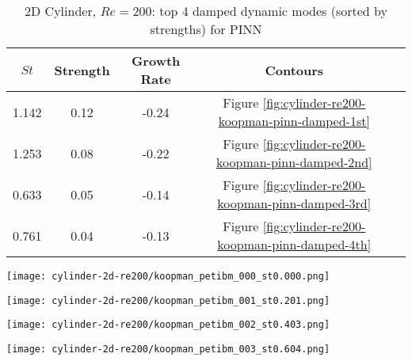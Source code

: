 \begin{table}[hbt!]
    \begin{threeparttable}[b]
        \begin{tabular}{ccccc}
            \toprule
            $St$ & Strength & Growth Rate & Contours \\
            \midrule
            1.142 & 0.12 & -0.24 & Figure \ref{fig:cylinder-re200-koopman-pinn-damped-1st}\\
            1.253 & 0.08 & -0.22 & Figure \ref{fig:cylinder-re200-koopman-pinn-damped-2nd}\\
            0.633 & 0.05 & -0.14 & Figure \ref{fig:cylinder-re200-koopman-pinn-damped-3rd}\\
            0.761 & 0.04 & -0.13 & Figure \ref{fig:cylinder-re200-koopman-pinn-damped-4th}\\
            \bottomrule
        \end{tabular}%
        \caption{%
            2D Cylinder, $Re=200$: top 4 damped dynamic modes (sorted by strengths) for PINN%
        }%
        \label{table:koopman-pinn-damped}
    \end{threeparttable}
\end{table}%

\begin{figure*}[!hbt]
    \centering%
    \texttt{[image: cylinder-2d-re200/koopman\_petibm\_000\_st0.000.png]}%
    \caption{%
        The \num{1}st mode in PetIBM.
    }
    \label{fig:cylinder-re200-koopman-petibm-1st}%
\end{figure*}

\begin{figure*}[!hbt]
    \centering%
    \texttt{[image: cylinder-2d-re200/koopman\_petibm\_001\_st0.201.png]}%
    \caption{%
        The \num{2}nd mode in PetIBM.
    }
    \label{fig:cylinder-re200-koopman-petibm-2nd}%
\end{figure*}

\begin{figure*}[!hbt]
    \centering%
    \texttt{[image: cylinder-2d-re200/koopman\_petibm\_002\_st0.403.png]}%
    \caption{%
        The \num{3}rd mode in PetIBM.
    }
    \label{fig:cylinder-re200-koopman-petibm-3rd}%
\end{figure*}

\begin{figure*}[!hbt]
    \centering%
    \texttt{[image: cylinder-2d-re200/koopman\_petibm\_003\_st0.604.png]}%
    \caption{%
        The \num{4}th mode in PetIBM.
    }
    \label{fig:cylinder-re200-koopman-petibm-4th}%
\end{figure*}

